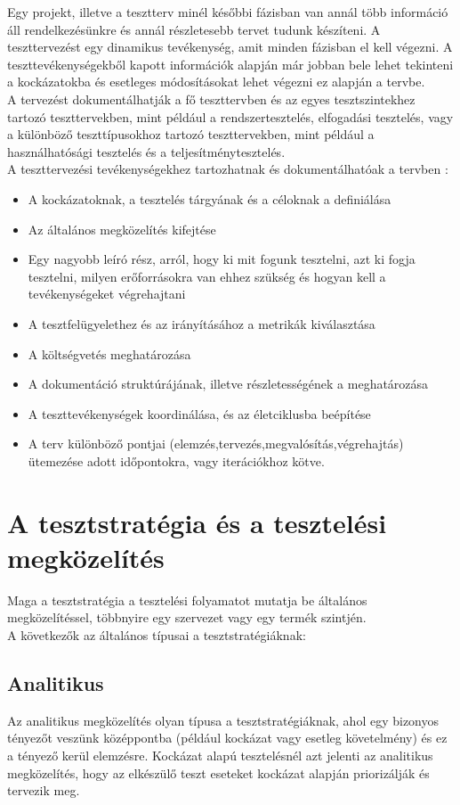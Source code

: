 Egy projekt, illetve a tesztterv minél későbbi fázisban van annál több információ áll rendelkezésünkre és annál részletesebb tervet tudunk készíteni. A teszttervezést egy dinamikus tevékenység, amit minden fázisban el kell végezni. A teszttevékenységekből kapott információk alapján már jobban bele lehet tekinteni a kockázatokba és esetleges módosításokat lehet végezni ez alapján a tervbe.\\
A tervezést dokumentálhatják a fő teszttervben és az egyes tesztszintekhez tartozó teszttervekben, mint például a rendszertesztelés, elfogadási tesztelés, vagy a különböző teszttípusokhoz tartozó teszttervekben, mint például a használhatósági tesztelés és a teljesítménytesztelés\cite{syllabus3}.\\
A teszttervezési tevékenységekhez tartozhatnak és dokumentálhatóak a tervben :
\begin{itemize}
\item A kockázatoknak, a tesztelés tárgyának és a céloknak a definiálása
\item Az általános megközelítés kifejtése
\item Egy nagyobb leíró rész, arról, hogy ki mit fogunk tesztelni, azt ki fogja tesztelni, milyen erőforrásokra van ehhez szükség és hogyan kell a tevékenységeket végrehajtani
\item A tesztfelügyelethez és az irányításához a metrikák kiválasztása
\item A költségvetés meghatározása
\item A dokumentáció struktúrájának, illetve részletességének a meghatározása
\item A teszttevékenységek koordinálása, és az életciklusba beépítése
\item A terv különböző pontjai (elemzés,tervezés,megvalósítás,végrehajtás) ütemezése adott időpontokra, vagy iterációkhoz kötve.
\end{itemize}

\section {A tesztstratégia és a tesztelési megközelítés}

Maga a tesztstratégia a tesztelési folyamatot mutatja be általános megközelítéssel, többnyire egy szervezet vagy egy termék szintjén.\\
A következők az általános típusai a tesztstratégiáknak:
\subsection{Analitikus} Az analitikus megközelítés olyan típusa a tesztstratégiáknak, ahol egy bizonyos tényezőt veszünk középpontba (például kockázat vagy esetleg követelmény) és ez a tényező kerül elemzésre.
Kockázat alapú tesztelésnél azt jelenti az analitikus megközelítés, hogy az elkészülő teszt eseteket kockázat alapján priorizálják és tervezik meg.


